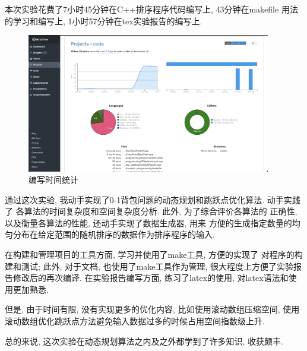 \label{ssub:实验心得}
本次实验花费了7小时45分钟在C++排序程序代码编写上, 43分钟在makefile
用法的学习和编写上, 1小时57分钟在tex实验报告的编写上.\par
\begin{figure}[ht!]
	\begin{center}
		\includegraphics[width=0.95\textwidth]{figures/screenTime.png}
	\end{center}
	\caption{编写时间统计}
	\label{fig:screenTime}
\end{figure}


通过这次实验, 我动手实现了0-1背包问题的动态规划和跳跃点优化算法. 动手实践了
各算法的时间复杂度和空间复杂度分析. 此外, 为了综合评价各算法的
正确性, 以及衡量各算法的性能, 还动手实现了数据生成器, 用来
方便的生成指定数量的均匀分布在给定范围的随机排序的数据作为排序程序的输入.\par

在构建和管理项目的工具方面, 学习并使用了make工具, 方便的实现了
对程序的构建和测试; 此外, 对于文档, 也使用了make工具作为管理,
很大程度上方便了实验报告修改后的再次编译. 在实验报告编写方面,
练习了latex的使用, 对latex语法和使用更加熟悉.\par

但是, 由于时间有限, 没有实现更多的优化内容, 比如使用滚动数组压缩空间,
使用滚动数组优化跳跃点方法避免输入数据过多的时候占用空间指数级上升.\par

总的来说, 这次实验在动态规划算法之内及之外都学到了许多知识, 收获颇丰.
